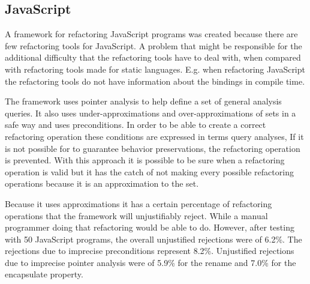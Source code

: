\subsection{JavaScript}

A framework \cite{feldthaus2011tool} for refactoring JavaScript programs was created because there are few refactoring tools for JavaScript. 
A problem that might be responsible for the additional difficulty that the refactoring tools have to deal with, when compared with refactoring tools made for static languages. 
E.g. when refactoring JavaScript the refactoring tools do not have information about the bindings in compile time.



The framework uses pointer analysis to help define a set of general analysis queries. 
It also uses under-approximations and over-approximations of sets in a safe way and uses preconditions.
In order to be able to create a correct refactoring operation these conditions are expressed in terms query analyses, 
If it is not possible for to guarantee behavior preservations, the refactoring operation is prevented.
With this approach it is possible to be sure when a refactoring operation is valid but it has the catch of not making every possible refactoring operations because it is an approximation to the set.



Because it uses approximations it has a certain percentage of refactoring operations that the framework will unjustifiably reject.
While a manual programmer doing that refactoring would be able to do. 
However, after testing with 50 JavaScript programs, the overall unjustified rejections were of 6.2\%. 
The rejections due to imprecise preconditions represent 8.2\%.
Unjustified rejections due to imprecise pointer analysis were of 5.9\% for the rename and 7.0\% for the encapsulate property. 
